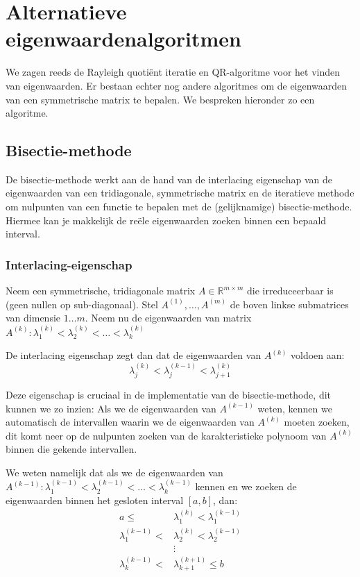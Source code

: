 \documentclass[a4paper]{article}
\begin{document}
\section{Alternatieve eigenwaardenalgoritmen}
	We zagen reeds de Rayleigh quotiënt iteratie en QR-algoritme voor het vinden van eigenwaarden. Er bestaan echter nog andere algoritmes om de eigenwaarden van een symmetrische matrix te bepalen. We bespreken hieronder zo een algoritme.
\subsection{Bisectie-methode}
	De bisectie-methode werkt aan de hand van de interlacing eigenschap van de eigenwaarden van een tridiagonale, symmetrische matrix en de iteratieve methode om nulpunten van een functie te bepalen met de (gelijknamige) bisectie-methode. Hiermee kan je makkelijk de reële eigenwaarden zoeken binnen een bepaald interval.
\subsubsection{Interlacing-eigenschap}
	Neem een symmetrische, tridiagonale matrix $A \in \mathbb{R}^{m\times m} $ die irreduceerbaar is (geen nullen op sub-diagonaal).
	Stel $A^{(1)},\dots ,A^{(m)}$ de boven linkse submatrices van dimensie $1\dots m$.
	Neem nu de eigenwaarden van matrix $A^{(k)}: \lambda _1^{(k)} < \lambda _2^{(k)} < \dots < \lambda _k^{(k)}$
	
	\noindent De interlacing eigenschap zegt dan dat de eigenwaarden van $A^{(k)}$ voldoen aan:
	\begin{equation}
		\lambda _j^{(k)} < \lambda_j^{(k-1)} < \lambda_{j+1}^{(k)}
	\end{equation}
	
	Deze eigenschap is cruciaal in de implementatie van de bisectie-methode, dit kunnen we zo inzien:
	Als we de eigenwaarden van $A^{(k-1)}$ weten, kennen we automatisch de intervallen waarin we de eigenwaarden van $A^{(k)}$ moeten zoeken, dit komt neer op de nulpunten zoeken van de karakteristieke polynoom van $A^{(k)}$ binnen die gekende intervallen.
	
	\noindent We weten namelijk dat als we de eigenwaarden van $A^{(k-1)}: \lambda _1^{(k-1)} < \lambda _2^{(k-1)} < \dots < \lambda _k^{(k-1)}$ kennen en we zoeken de eigenwaarden binnen het gesloten interval $[a,b]$, dan:
	\begin{align*}
		a \le &\lambda_1^{(k)} < \lambda_1^{(k-1)}\\
		\lambda_1^{(k-1)} < &\lambda_2^{(k)} < \lambda_2^{(k-1)}\\
		&\vdots\\
		\lambda _k^{(k-1)} < &\lambda _{k+1}^{(k+1)} \le b\\
	\end{align*}
	
\end{document}
